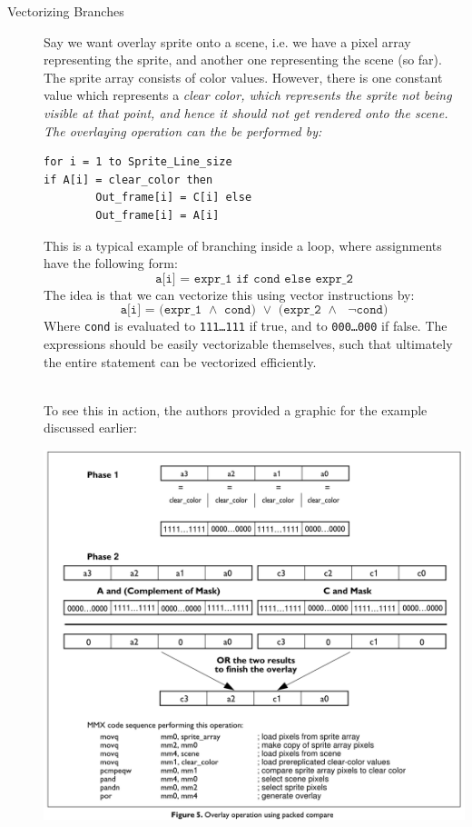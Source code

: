 \documentclass[../../main.tex]{subfiles}
\begin{document}
\begin{description}
    \item[Vectorizing Branches] Say we want overlay sprite onto a scene, i.e. we have a pixel array representing the sprite, and another one representing the scene (so far). The sprite array consists of color values. However, there is one constant value which represents a \em clear color\em , which represents the sprite not being visible at that point, and hence it should not get rendered onto the scene. The overlaying operation can the be performed by:
    \begin{lstlisting}
for i = 1 to Sprite_Line_size
if A[i] = clear_color then
        Out_frame[i] = C[i] else
        Out_frame[i] = A[i]
    \end{lstlisting}

    This is a typical example of branching inside a loop, where assignments have the following form:
    \[
        \texttt{a[i] = expr\_1 if cond else expr\_2}
    \]
    The idea is that we can vectorize this using vector instructions by:
    \[
        \texttt{a[i] = (expr\_1 $\land$ cond) $\lor$ (expr\_2 $\land$ $\lnot$cond)}
    \]
    Where \texttt{cond} is evaluated to \texttt{111\dots111} if true, and to \texttt{000\dots000} if false. The expressions should be easily vectorizable themselves, such that ultimately the entire statement can be vectorized efficiently.

    ~\\
    To see this in action, the authors provided a graphic for the example discussed earlier:

    \includegraphics[width=\textwidth]{Chapters/07/vectorizing_branches.png}


\end{description}
\end{document}
